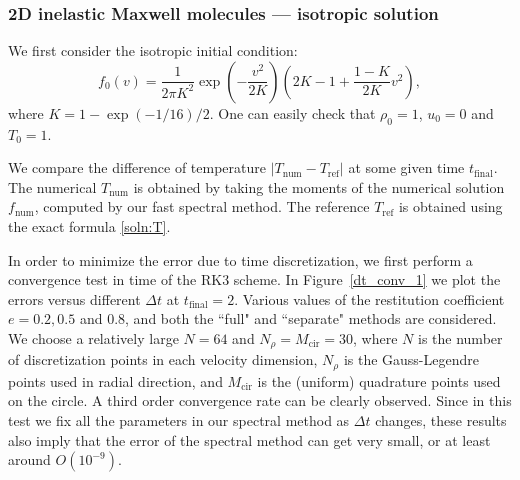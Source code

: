 \documentclass[review, times]{elsarticle}
\begin{document}
\subsubsection{2D inelastic Maxwell molecules --- isotropic solution}

We first consider the isotropic initial condition:
\begin{equation} \label{ext1}
  f_0(v) = \frac{1}{2\pi K^2}\exp\left(-\frac{v^2}{2K}\right)\left(2K-1+\frac{1-K}{2K}v^2\right),
\end{equation}
where $K=1-\exp(-1/16)/2$. One can easily check that $\rho_0 = 1$, $u_0 = 0$ and $T_0 =1$.

We compare the difference of temperature $|T_\text{num} - T_\text{ref}|$ at some given time $t_\text{final}$. The numerical $T_\text{num}$ is obtained by taking the moments of the numerical solution $f_\text{num}$, computed by our fast spectral method. The reference $T_\text{ref}$ is obtained using the exact formula \eqref{soln:T}. 

In order to minimize the error due to time discretization, we first perform a convergence test in time of the RK3 scheme. In Figure~\ref{dt_conv_1} we plot the errors versus different $\Delta t$ at $t_\text{final}=2$. Various values of the restitution coefficient $e = 0.2, 0.5$ and $0.8$, and both the ``full" and ``separate" methods are considered. We choose a relatively large $N=64$ and $N_{\rho}=M_{\text{cir}}=30$, where $N$ is the number of discretization points in each velocity dimension, $N_{\rho}$ is the Gauss-Legendre points used in radial direction, and $M_{\text{cir}}$ is the (uniform) quadrature points used on the circle. A third order convergence rate can be clearly observed. Since in this test we fix all the parameters in our spectral method as $\Delta t$ changes, these results also imply that the error of the spectral method can get very small, or at least around $O(10^{-9})$.
\end{document}
